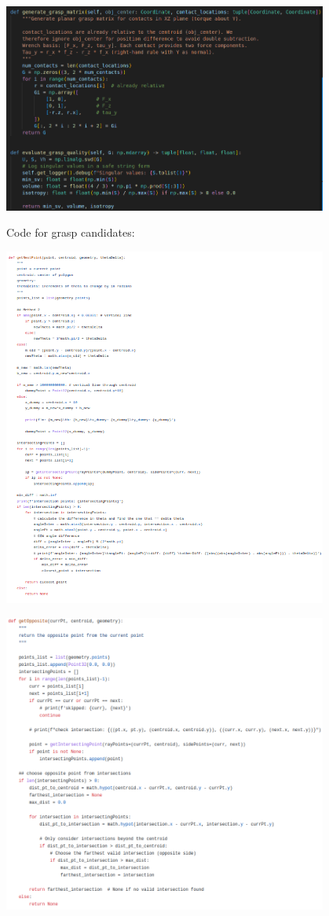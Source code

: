 \documentclass[12pt]{article}
\begin{document}
\begin{center}
	\includegraphics[width=0.8\textwidth]{graspmatrixcode.png}
\end{center}

Code for grasp candidates:
\begin{center}
	\includegraphics[width=0.8\textwidth]{get_next.png}
\end{center}

\begin{center}
	\includegraphics[width=0.8\textwidth]{get_opposite.png}
\end{center}
\end{document}
